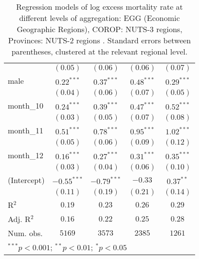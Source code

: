 \begin{table}[h!]
\begin{center}
\begin{small}
\begin{tabular}{l c c c c}
               & $(0.05)$      & $(0.06)$      & $(0.06)$      & $(0.07)$      \\
male           & $0.22^{***}$  & $0.37^{***}$  & $0.48^{***}$  & $0.29^{***}$  \\
               & $(0.04)$      & $(0.06)$      & $(0.07)$      & $(0.05)$      \\
month\_10      & $0.24^{***}$  & $0.39^{***}$  & $0.47^{***}$  & $0.52^{***}$  \\
               & $(0.03)$      & $(0.05)$      & $(0.07)$      & $(0.08)$      \\
month\_11      & $0.51^{***}$  & $0.78^{***}$  & $0.95^{***}$  & $1.02^{***}$  \\
               & $(0.05)$      & $(0.06)$      & $(0.09)$      & $(0.12)$      \\
month\_12      & $0.16^{***}$  & $0.27^{***}$  & $0.31^{***}$  & $0.35^{***}$  \\
               & $(0.03)$      & $(0.04)$      & $(0.06)$      & $(0.10)$      \\
(Intercept)    & $-0.55^{***}$ & $-0.79^{***}$ & $-0.33$       & $0.37^{**}$   \\
               & $(0.11)$      & $(0.19)$      & $(0.21)$      & $(0.14)$      \\
\hline
R$^2$          & $0.19$        & $0.23$        & $0.26$        & $0.29$        \\
Adj. R$^2$     & $0.16$        & $0.22$        & $0.25$        & $0.28$        \\
Num. obs.      & $5169$        & $3573$        & $2385$        & $1261$        \\
\hline
\multicolumn{5}{l}{\tiny{$^{***}p<0.001$; $^{**}p<0.01$; $^{*}p<0.05$}}
\end{tabular}
\end{small}
\caption{Regression models of log excess mortality rate at different levels of aggregation: EGG (Economic Geographic Regions), COROP: NUTS-3 regions, Provinces: NUTS-2 regions . Standard errors between parentheses, clustered at the relevant regional level.}
\label{tab:regionmodels}
\end{center}
\end{table}
